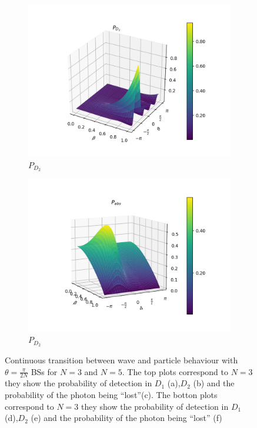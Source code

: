 \documentclass{book}
\begin{document}
\begin{figure}[H]
\begin{subfigure}[b]{0.30\linewidth}
\includegraphics[width=\linewidth]{images/pd2_5.png}
\caption{$P_{D_{2}}$ }
\label{fig:BS1}
\end{subfigure}
\begin{subfigure}[b]{0.30\linewidth}
\includegraphics[width=\linewidth]{images/pabs_5.png}
\caption{$P_{D_{2}}$ }
\label{fig:BS1}
\end{subfigure}
\caption{Continuous transition between wave and particle behaviour with $\theta=\frac{\pi}{2N}$ BSs for $N=3$ and $N=5$. The top plots correspond to $N=3$ they show the probability of detection in $D_{1}$ (a),$D_{2}$ (b) and the probability of the photon being ``lost''(c). The botton plots correspond to $N=3$ they show the probability of detection in $D_{1}$ (d),$D_{2}$ (e) and the probability of the photon being ``lost'' (f)}
\label{varias2}
\end{figure}
\end{document}
